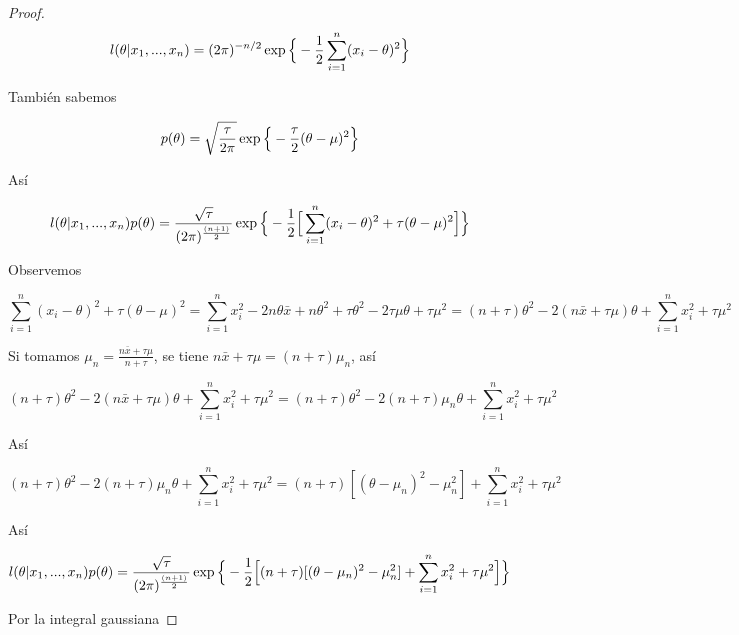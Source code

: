\documentclass[11pt,letterpaper]{article}
\begin{document}
\begin{proof}
    \[
        l(\theta|x_1,...,x_n)=(2\pi)^{-n/2}\exp\Big{\{}-\frac{1}{2}\sum_{i=1}^n(x_i-\theta)^2\Big{\}}
    \]

    También sabemos

    \[
        p(\theta)=\sqrt{\frac{\tau}{2\pi}}\exp\Big{\{}-\frac{\tau}{2}(\theta-\mu)^2\Big{\}}
    \]

    Así

    \begin{equation*}
        l(\theta|x_1,...,x_n)p(\theta)=\frac{\sqrt{\tau}}{(2\pi)^{\frac{(n+1)}{2}}}\exp\Big{\{}-\frac{1}{2}\Big{[}\sum_{i=1}^n(x_i-\theta)^2+\tau(\theta-\mu)^2\Big{]}\Big{\}}
    \end{equation*}

    Observemos
    
    \begin{equation*}
        \sum_{i=1}^n(x_i-\theta)^2+\tau(\theta-\mu)^2=\sum_{i=1}^nx_i^2-2n\theta\bar{x}+n\theta^2+\tau\theta^2-2\tau\mu\theta+\tau\mu^2=(n+\tau)\theta^2-2(n\bar{x}+\tau\mu)\theta+\sum_{i=1}^nx_i^2+\tau\mu^2
    \end{equation*}

    Si tomamos $\mu_n=\frac{n\bar{x}+\tau\mu}{n+\tau}$, se tiene $n\bar{x}+\tau\mu=(n+\tau)\mu_n$, así

    \begin{equation*}
        (n+\tau)\theta^2-2(n\bar{x}+\tau\mu)\theta+\sum_{i=1}^nx_i^2+\tau\mu^2=(n+\tau)\theta^2-2(n+\tau)\mu_n\theta+\sum_{i=1}^nx_i^2+\tau\mu^2
    \end{equation*}

    Así

    \begin{equation*}
        (n+\tau)\theta^2-2(n+\tau)\mu_n\theta+\sum_{i=1}^nx_i^2+\tau\mu^2=(n+\tau)[(\theta-\mu_n)^2-\mu_n^2]+\sum_{i=1}^nx_i^2+\tau\mu^2
    \end{equation*}

    Así

    \begin{equation*}
        l(\theta|x_1,...,x_n)p(\theta)=\frac{\sqrt{\tau}}{(2\pi)^{\frac{(n+1)}{2}}}\exp\Big{\{}-\frac{1}{2}\Big{[}(n+\tau)[(\theta-\mu_n)^2-\mu_n^2]+\sum_{i=1}^nx_i^2+\tau\mu^2\Big{]}\Big{\}}
    \end{equation*}

    Por la integral gaussiana


\end{proof}
\end{document}
